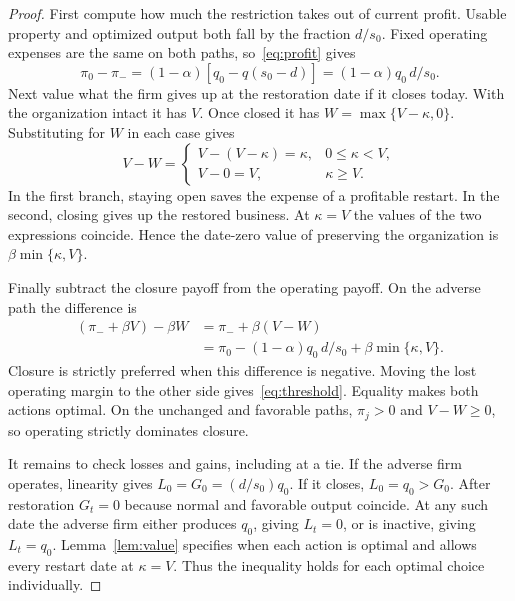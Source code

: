 \documentclass[11pt,letterpaper]{article}
\begin{document}
\begin{proof}
First compute how much the restriction takes out of current profit. Usable property and optimized output both fall by the fraction $d/s_0$. Fixed operating expenses are the same on both paths, so~\eqref{eq:profit} gives
\[
 \pi_0-\pi_-=(1-\alpha)[q_0-q(s_0-d)]
             =(1-\alpha)q_0\,d/s_0 .
\]
Next value what the firm gives up at the restoration date if it closes today. With the organization intact it has $V$. Once closed it has $W=\max\{V-\kappa,0\}$. Substituting for $W$ in each case gives
\[
 V-W=
 \begin{cases}
  V-(V-\kappa)=\kappa, & 0\leq\kappa<V,\\
  V-0=V, & \kappa\geq V .
 \end{cases}
\]
In the first branch, staying open saves the expense of a profitable restart. In the second, closing gives up the restored business. At $\kappa=V$ the values of the two expressions coincide. Hence the date-zero value of preserving the organization is $\beta\min\{\kappa,V\}$.

Finally subtract the closure payoff from the operating payoff. On the adverse path the difference is
\begin{align*}
 (\pi_-+\beta V)-\beta W
   &=\pi_-+\beta(V-W)\\
   &=\pi_0-(1-\alpha)q_0\,d/s_0+\beta\min\{\kappa,V\}.
\end{align*}
Closure is strictly preferred when this difference is negative. Moving the lost operating margin to the other side gives~\eqref{eq:threshold}. Equality makes both actions optimal. On the unchanged and favorable paths, $\pi_j>0$ and $V-W\geq0$, so operating strictly dominates closure.

It remains to check losses and gains, including at a tie. If the adverse firm operates, linearity gives $L_0=G_0=(d/s_0)q_0$. If it closes, $L_0=q_0>G_0$. After restoration $G_t=0$ because normal and favorable output coincide. At any such date the adverse firm either produces $q_0$, giving $L_t=0$, or is inactive, giving $L_t=q_0$. Lemma~\ref{lem:value} specifies when each action is optimal and allows every restart date at $\kappa=V$. Thus the inequality holds for each optimal choice individually.
\end{proof}
\end{document}
